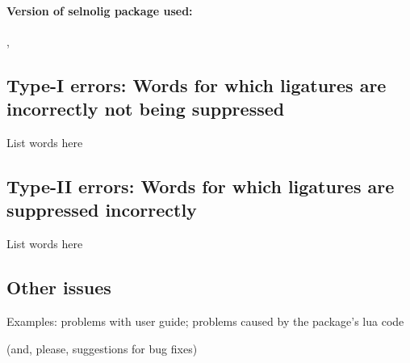 \documentclass{article}
\begin{document}
\paragraph*{Version of selnolig package used:} 
\selnoligpackageversion, \selnoligpackagedate %


\subsection*{Type-I errors: Words for which ligatures are incorrectly not being suppressed}

List words here

\subsection*{Type-II errors: Words for which ligatures are suppressed incorrectly}

List words here

\subsection*{Other issues}

Examples: problems with user guide; problems caused by the package's lua code 

(and, please, suggestions for bug fixes)
\end{document}
